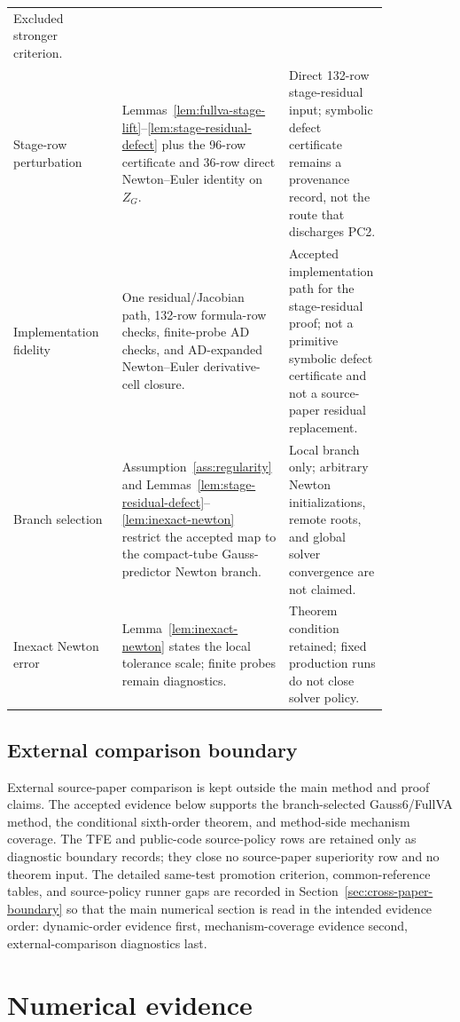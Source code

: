 \documentclass[preprint,12pt]{elsarticle}
\newcommand{\tfe}{TFE}
\begin{document}
\begin{table}[htbp]
\begin{tabular}{P{0.28\linewidth}P{0.36\linewidth}P{0.20\linewidth}}
Excluded stronger criterion. \\
Stage-row perturbation &
Lemmas~\ref{lem:fullva-stage-lift}--\ref{lem:stage-residual-defect} plus the
96-row certificate and 36-row direct Newton--Euler identity on \(Z_G\). &
Direct 132-row stage-residual input; symbolic defect certificate remains a
provenance record, not the route that discharges PC2. \\
Implementation fidelity &
One residual/Jacobian path, 132-row formula-row checks, finite-probe AD checks,
and AD-expanded Newton--Euler derivative-cell closure. &
Accepted implementation path for the stage-residual proof; not a primitive
symbolic defect certificate and not a source-paper residual replacement. \\
Branch selection &
Assumption~\ref{ass:regularity} and
Lemmas~\ref{lem:stage-residual-defect}--\ref{lem:inexact-newton} restrict the
accepted map to the compact-tube Gauss-predictor Newton branch. &
Local branch only; arbitrary Newton initializations, remote roots, and global
solver convergence are not claimed. \\
Inexact Newton error &
Lemma~\ref{lem:inexact-newton} states the local tolerance scale; finite probes
remain diagnostics. &
Theorem condition retained; fixed production runs do not close solver policy. \\
\bottomrule
\end{tabular}
\end{table}

\subsection{External comparison boundary}
\label{sec:external-comparison-boundary-pointer}

External source-paper comparison is kept outside the main method and proof
claims.  The accepted evidence below supports the branch-selected
Gauss6/FullVA method, the conditional sixth-order theorem, and method-side
mechanism coverage.  The \tfe{} and public-code source-policy rows are
retained only as diagnostic boundary records; they close no source-paper
superiority row and no theorem input.  The detailed same-test promotion
criterion, common-reference tables, and source-policy runner gaps are recorded
in Section~\ref{sec:cross-paper-boundary} so that the main numerical section
is read in the intended evidence order: dynamic-order evidence first,
mechanism-coverage evidence second, external-comparison diagnostics last.

\section{Numerical evidence}
\label{sec:numerical}
\end{document}
